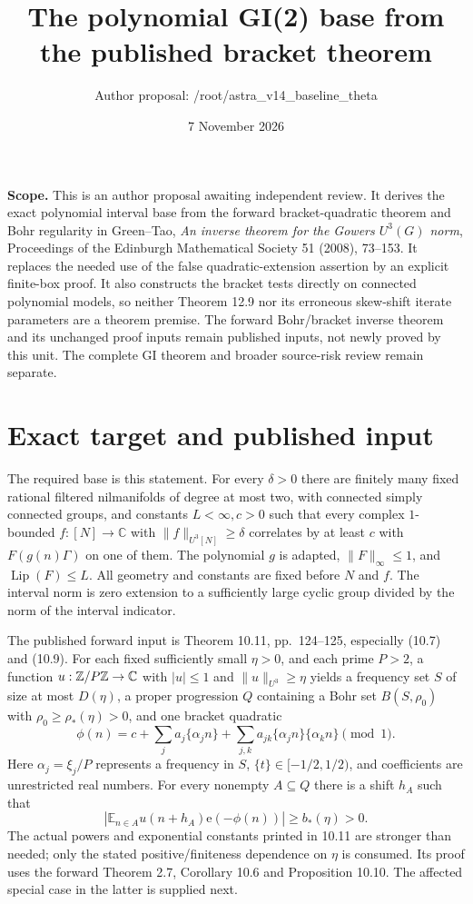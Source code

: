 \documentclass[11pt]{article}
\title{The polynomial GI(2) base from the published bracket theorem}
\author{Author proposal: /root/astra\_v14\_baseline\_theta}
\date{7 November 2026}
\newcommand{\C}{\mathbb C}\newcommand{\E}{\mathbb E}
\newcommand{\ee}{\mathrm e}
\begin{document}
\maketitle

\noindent\textbf{Scope.} This is an author proposal awaiting independent
review. It derives the exact polynomial interval base from the forward
bracket-quadratic theorem and Bohr regularity in Green--Tao,
\emph{An inverse theorem for the Gowers $U^3(G)$ norm}, Proceedings of
the Edinburgh Mathematical Society 51 (2008), 73--153. It replaces the
needed use of the false quadratic-extension assertion by an explicit
finite-box proof. It also constructs the bracket tests directly on
connected polynomial models, so neither Theorem 12.9 nor its erroneous
skew-shift iterate parameters are a theorem premise. The forward
Bohr/bracket inverse theorem and its unchanged proof inputs remain
published inputs, not newly proved by this unit. The complete GI theorem
and broader source-risk review remain separate.

\section{Exact target and published input}

The required base is this statement. For every $\delta>0$ there are
finitely many fixed rational filtered nilmanifolds of degree at most two,
with connected simply connected groups, and constants $L<\infty,c>0$
such that every complex $1$-bounded $f:[N]\to\C$ with
$\|f\|_{U^3[N]}\geq\delta$ correlates by at least $c$ with
$F(g(n)\Gamma)$ on one of them. The polynomial $g$ is adapted,
$\|F\|_\infty\leq1$, and $\operatorname{Lip}(F)\leq L$.
All geometry and constants are fixed before $N$ and $f$.
The interval norm is zero extension to a sufficiently large cyclic
group divided by the norm of the interval indicator.

The published forward input is Theorem 10.11, pp.~124--125, especially
(10.7) and (10.9). For each fixed sufficiently small $\eta>0$, and
each prime $P>2$, a function $u:\Z/P\Z\to\C$ with
$|u|\leq1$ and $\|u\|_{U^3}\geq\eta$ yields a frequency set
$S$ of size at most $D(\eta)$, a proper progression $Q$ containing
a Bohr set $B(S,\rho_0)$ with $\rho_0\geq\rho_*(\eta)>0$,
and one bracket quadratic
\[
 \phi(n)=c+\sum_j a_j\{\alpha_jn\}
                  +\sum_{j,k}a_{jk}\{\alpha_jn\}\{\alpha_kn\}
       \pmod1 .
\]
Here $\alpha_j=\xi_j/P$ represents a frequency in $S$,
$\{t\}\in[-1/2,1/2)$, and coefficients are unrestricted real numbers.
For every nonempty $A\subseteq Q$ there is a shift $h_A$ such that
\[
 \left|\E_{n\in A}u(n+h_A)\ee(-\phi(n))\right|
 \geq b_*(\eta)>0.
\]
The actual powers and exponential constants printed in 10.11 are
stronger than needed; only the stated positive/finiteness dependence
on $\eta$ is consumed. Its proof uses the forward Theorem 2.7,
Corollary 10.6 and Proposition 10.10. The affected special case in the
latter is supplied next.
\end{document}

